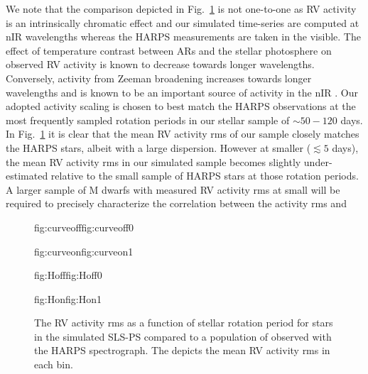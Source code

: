 We note that the comparison depicted in Fig.~\ref{BSfig:activityrms}
is not one-to-one as RV activity is an intrinsically chromatic effect and our
simulated time-series are computed at nIR wavelengths whereas the HARPS measurements are taken in the
visible. The effect of temperature contrast between ARs and the stellar photosphere on observed RV activity
is known to decrease towards longer wavelengths. Conversely, activity from Zeeman broadening increases towards
longer wavelengths and is known to be an important source of activity in the nIR \citep{hebrard14,moutou17}.
Our adopted activity scaling is chosen to best match the HARPS observations at the most frequently sampled rotation periods
in our stellar sample of $\sim 50-120$ days. In Fig.~\ref{BSfig:activityrms} it is clear that the mean RV activity rms
of our sample closely matches the HARPS stars, albeit with a large dispersion.
However at smaller \prot{} ($\lesssim 5$ days),
the mean RV activity rms in our simulated sample becomes slightly under-estimated relative to
the small sample of HARPS stars at those rotation periods. A larger sample of M dwarfs with measured RV activity rms at 
small \prot{} will be required to precisely characterize the correlation between the activity rms and

\begin{figure}
  \centering
  \hspace{-\hsize}%
  \begin{ocg}{fig:curveoff}{fig:curveoff}{0}%
  \end{ocg}%
  \begin{ocg}{fig:curveon}{fig:curveon}{1}%
  \end{ocg}
  \hspace{-\hsize}%
  \begin{ocg}{fig:Hoff}{fig:Hoff}{0}%
  \end{ocg}%
  \begin{ocg}{fig:Hon}{fig:Hon}{1}%
  \end{ocg}
  \hspace{-\hsize}%
  \caption{The RV activity rms as a function of stellar rotation period for stars in the simulated SLS-PS compared
    to a population of  observed with the HARPS
    spectrograph. The  depicts the mean
    RV activity rms in each \prot{} bin.}
  \label{BSfig:activityrms}
\end{figure}


